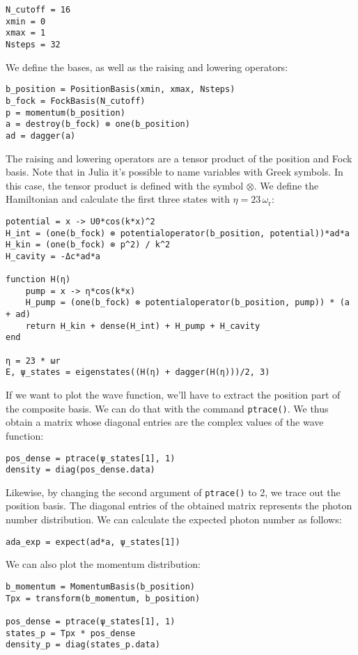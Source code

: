 \begin{lstlisting}
N_cutoff = 16
xmin = 0
xmax = 1
Nsteps = 32
\end{lstlisting}We define the bases, as well as the raising and lowering operators:

\begin{lstlisting}
b_position = PositionBasis(xmin, xmax, Nsteps)
b_fock = FockBasis(N_cutoff)
p = momentum(b_position)
a = destroy(b_fock) ⊗ one(b_position)
ad = dagger(a)
\end{lstlisting}The raising and lowering operators are a tensor product of the position and Fock basis. Note that in Julia it's possible to name variables with Greek symbols. In this case, the tensor product is defined with the symbol $\otimes$. We define the Hamiltonian and calculate the first three states with $\eta = 23 \, \omega_\text{r}$:

\begin{lstlisting}
potential = x -> U0*cos(k*x)^2
H_int = (one(b_fock) ⊗ potentialoperator(b_position, potential))*ad*a
H_kin = (one(b_fock) ⊗ p^2) / k^2
H_cavity = -Δc*ad*a

function H(η)
    pump = x -> η*cos(k*x)
    H_pump = (one(b_fock) ⊗ potentialoperator(b_position, pump)) * (a + ad)
    return H_kin + dense(H_int) + H_pump + H_cavity
end

η = 23 * ωr
E, ψ_states = eigenstates((H(η) + dagger(H(η)))/2, 3)
\end{lstlisting}If we want to plot the wave function, we'll have to extract the position part of the composite basis. We can do that with the command \texttt{ptrace()}. We thus obtain a matrix whose diagonal entries are the complex values of the wave function:

\begin{lstlisting}
pos_dense = ptrace(ψ_states[1], 1)
density = diag(pos_dense.data)
\end{lstlisting} Likewise, by changing the second argument of \texttt{ptrace()} to 2, we trace out the position basis. The diagonal entries of the obtained matrix represents the photon number distribution. We can calculate the expected photon number as follows:

\begin{lstlisting}
ada_exp = expect(ad*a, ψ_states[1])
\end{lstlisting}We can also plot the momentum distribution:

\begin{lstlisting}
b_momentum = MomentumBasis(b_position)
Tpx = transform(b_momentum, b_position)

pos_dense = ptrace(ψ_states[1], 1)
states_p = Tpx * pos_dense
density_p = diag(states_p.data)
\end{lstlisting}

